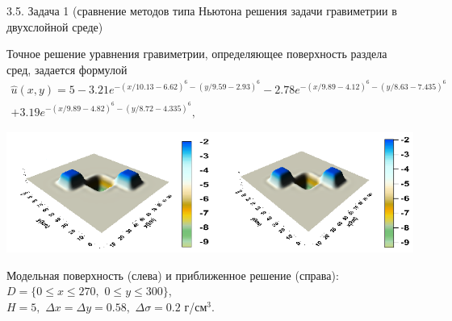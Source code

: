 \documentclass[10pt,pdf, mathserif, hyperref={unicode}]{beamer}
\begin{document}
\begin{frame}{3.5. Задача 1 (сравнение методов типа Ньютона решения задачи гравиметрии в двухслойной среде)}
	
	Точное решение уравнения гравиметрии, определяющее поверхность раздела сред, задается формулой
	\begin{equation*}
	\begin{aligned}
	\hat{u}(x,y)=5-3.21e^{-(x/10.13-6.62)^6-(y/9.59-2.93)^6}-2.78e^{-(x/9.89-4.12)^6-(y/8.63-7.435)^6}\\+3.19e^{-(x/9.89-4.82)^6-(y/8.72-4.335)^6},
	\end{aligned} 
	\end{equation*}
	\centering
		
	\includegraphics[width=\textwidth, height=0.35\textheight]{gravy_kiev2014.png}
	
	Модельная поверхность (слева) и приближенное решение (справа): $D=\{0\leqslant x\leqslant 270, \,\,0\leqslant y\leqslant 300\}$, \\ $  H=5,\,\,\Delta x=\Delta y=0.58,\,\,\Delta\sigma=0.2$ г/см$^3$.
\end{frame}
\end{document}
